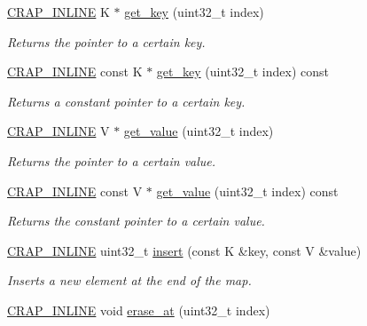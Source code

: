 \begin{DoxyCompactItemize}
\hyperlink{config__x86_8h_a5a40526b8d842e7ff731509998bb0f1c}{C\+R\+A\+P\+\_\+\+I\+N\+L\+I\+N\+E} K $\ast$ \hyperlink{classcrap_1_1sorted__array__map_a5c529416769126ae243cb21b95bbffee}{get\+\_\+key} (uint32\+\_\+t index)
\begin{DoxyCompactList}\small\item\em Returns the pointer to a certain key. \end{DoxyCompactList}\item 
\hyperlink{config__x86_8h_a5a40526b8d842e7ff731509998bb0f1c}{C\+R\+A\+P\+\_\+\+I\+N\+L\+I\+N\+E} const K $\ast$ \hyperlink{classcrap_1_1sorted__array__map_a6eee86753423e551f7f2bfbaa1269073}{get\+\_\+key} (uint32\+\_\+t index) const 
\begin{DoxyCompactList}\small\item\em Returns a constant pointer to a certain key. \end{DoxyCompactList}\item 
\hyperlink{config__x86_8h_a5a40526b8d842e7ff731509998bb0f1c}{C\+R\+A\+P\+\_\+\+I\+N\+L\+I\+N\+E} V $\ast$ \hyperlink{classcrap_1_1sorted__array__map_a4a168a9dedeaa15534bce4c37bc49d06}{get\+\_\+value} (uint32\+\_\+t index)
\begin{DoxyCompactList}\small\item\em Returns the pointer to a certain value. \end{DoxyCompactList}\item 
\hyperlink{config__x86_8h_a5a40526b8d842e7ff731509998bb0f1c}{C\+R\+A\+P\+\_\+\+I\+N\+L\+I\+N\+E} const V $\ast$ \hyperlink{classcrap_1_1sorted__array__map_ae56e4d457796168f89543025290c949b}{get\+\_\+value} (uint32\+\_\+t index) const 
\begin{DoxyCompactList}\small\item\em Returns the constant pointer to a certain value. \end{DoxyCompactList}\item 
\hyperlink{config__x86_8h_a5a40526b8d842e7ff731509998bb0f1c}{C\+R\+A\+P\+\_\+\+I\+N\+L\+I\+N\+E} uint32\+\_\+t \hyperlink{classcrap_1_1sorted__array__map_a052ea65b7ab0fec085aea90248c199bc}{insert} (const K \&key, const V \&value)
\begin{DoxyCompactList}\small\item\em Inserts a new element at the end of the map. \end{DoxyCompactList}\item 
\hyperlink{config__x86_8h_a5a40526b8d842e7ff731509998bb0f1c}{C\+R\+A\+P\+\_\+\+I\+N\+L\+I\+N\+E} void \hyperlink{classcrap_1_1sorted__array__map_ada33a370e1ef16fc459600de24e19e79}{erase\+\_\+at} (uint32\+\_\+t index)

\end{DoxyCompactItemize}
